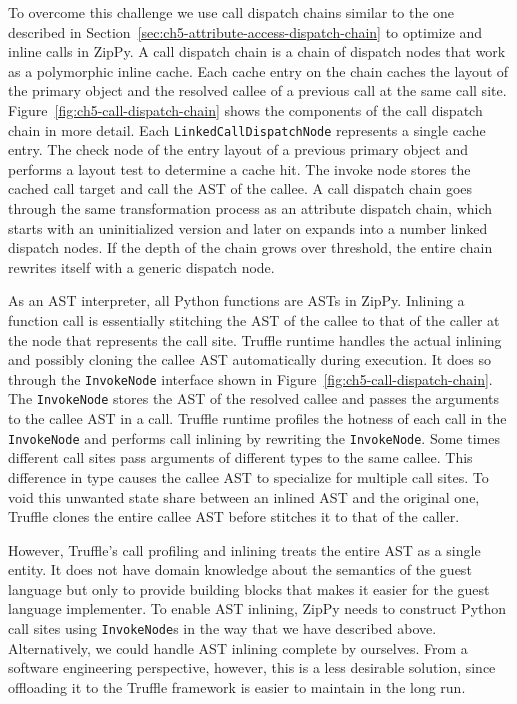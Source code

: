 To overcome this challenge we use call dispatch chains similar to the one described in Section~\ref{sec:ch5-attribute-access-dispatch-chain} to optimize and inline calls in ZipPy.
A call dispatch chain is a chain of dispatch nodes that work as a polymorphic inline cache.
Each cache entry on the chain caches the layout of the primary object and the resolved callee of a previous call at the same call site.
Figure~\ref{fig:ch5-call-dispatch-chain} shows the components of the call dispatch chain in more detail.
Each \texttt{LinkedCallDispatchNode} represents a single cache entry.
The check node of the entry layout of a previous primary object and performs a layout test to determine a cache hit.
The invoke node stores the cached call target and call the AST of the callee.
A call dispatch chain goes through the same transformation process as an attribute dispatch chain, which starts with an uninitialized version and later on expands into a number linked dispatch nodes.
If the depth of the chain grows over threshold, the entire chain rewrites itself with a generic dispatch node.

As an AST interpreter, all Python functions are ASTs in ZipPy.
Inlining a function call is essentially stitching the AST of the callee to that of the caller at the node that represents the call site.
Truffle runtime handles the actual inlining and possibly cloning the callee AST automatically during execution.
It does so through the \texttt{InvokeNode} interface shown in Figure~\ref{fig:ch5-call-dispatch-chain}.
The \texttt{InvokeNode} stores the AST of the resolved callee and passes the arguments to the callee AST in a call.
Truffle runtime profiles the hotness of each call in the \texttt{InvokeNode} and performs call inlining by rewriting the \texttt{InvokeNode}.
Some times different call sites pass arguments of different types to the same callee.
This difference in type causes the callee AST to specialize for multiple call sites.
To void this unwanted state share between an inlined AST and the original one, Truffle clones the entire callee AST before stitches it to that of the caller.

However, Truffle's call profiling and inlining treats the entire AST as a single entity.
It does not have domain knowledge about the semantics of the guest language but only to provide building blocks that makes it easier for the guest language implementer.
To enable AST inlining, ZipPy needs to construct Python call sites using \texttt{InvokeNode}s in the way that we have described above.
Alternatively, we could handle AST inlining complete by ourselves.
From a software engineering perspective, however, this is a less desirable solution, since offloading it to the Truffle framework is easier to maintain in the long run.

